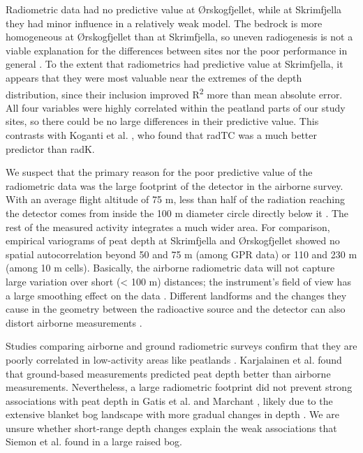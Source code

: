 \documentclass[soil, manuscript]{copernicus}
\begin{document}
Radiometric data had no predictive value at Ørskogfjellet, while at Skrimfjella they had minor influence in a relatively weak model.
The bedrock is more homogeneous at Ørskogfjellet than at Skrimfjella, so uneven radiogenesis is not a viable explanation for the differences between sites nor the poor performance in general \citep{beamishEnvironmentalRadioactivityUK2014, reinhardtGammaraySpectrometryVersatile2019}.
To the extent that radiometrics had predictive value at Skrimfjella, it appears that they were most valuable near the extremes of the depth distribution, since their inclusion improved R\textsuperscript{2} more than mean absolute error.
All four variables were highly correlated within the peatland parts of our study sites, so there could be no large differences in their predictive value.
This contrasts with Koganti et al. \citeyearpar{kogantiMappingPeatDepth2023}, who found that radTC was a much better predictor than radK.

We suspect that the primary reason for the poor predictive value of the radiometric data was the large footprint of the detector in the airborne survey.
With an average flight altitude of 75 m, less than half of the radiation reaching the detector comes from inside the 100 m diameter circle directly below it \citep{beamishEnhancingResolutionAirborne2016, beamishDetailedMappingPeat2024}.
The rest of the measured activity integrates a much wider area.
For comparison, empirical variograms of peat depth at Skrimfjella and Ørskogfjellet showed no spatial autocorrelation beyond 50 and 75 m (among GPR data) or 110 and 230 m (among 10 m cells).
Basically, the airborne radiometric data will not capture large variation over short (\textless{} 100 m) distances; the instrument's field of view has a large smoothing effect on the data \citep{beamishEnhancingResolutionAirborne2016, reinhardtGammaraySpectrometryVersatile2019}.
Different landforms and the changes they cause in the geometry between the radioactive source and the detector can also distort airborne measurements \citep{reinhardtGammaraySpectrometryVersatile2019}.

Studies comparing airborne and ground radiometric surveys confirm that they are poorly correlated in low-activity areas like peatlands \citep{kockComparisonAirborneTerrestrial2011, karjalainenComparisonTwoGammaray2024}.
Karjalainen et al. \citeyearpar{karjalainenComparisonTwoGammaray2024} found that ground-based measurements predicted peat depth better than airborne measurements.
Nevertheless, a large radiometric footprint did not prevent strong associations with peat depth in Gatis et al. \citeyearpar{gatisMappingUplandPeat2019} and Marchant \citeyearpar{marchantUsingRemoteSensors2021}, likely due to the extensive blanket bog landscape with more gradual changes in depth \citep{lindsayBogsEcologyClassification1995, lyngstadBeskrivelserAvTorvmassivenheter2023}.
We are unsure whether short-range depth changes explain the weak associations that Siemon et al. \citeyearpar{siemonAirborneElectromagneticRadiometric2020} found in a large raised bog.
\end{document}
